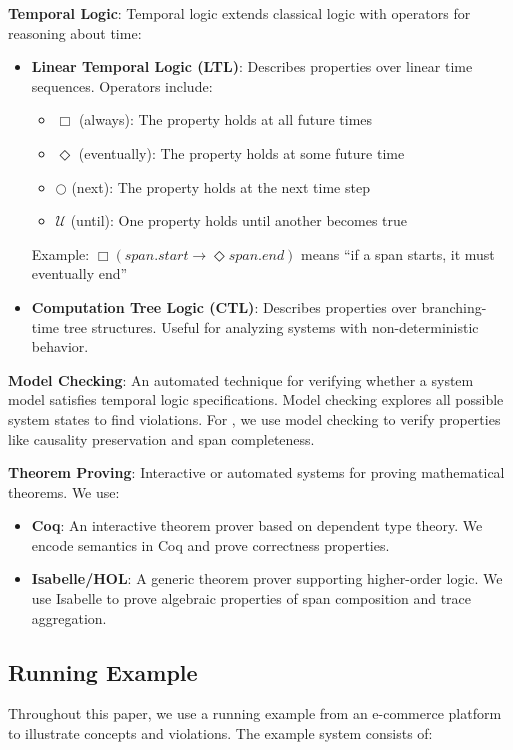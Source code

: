 \textbf{Temporal Logic}: Temporal logic extends classical logic with operators for reasoning about time:
\begin{itemize}
\item \textbf{Linear Temporal Logic (LTL)}: Describes properties over linear time sequences. Operators include:
  \begin{itemize}
  \item $\Box$ (always): The property holds at all future times
  \item $\Diamond$ (eventually): The property holds at some future time
  \item $\bigcirc$ (next): The property holds at the next time step
  \item $\mathcal{U}$ (until): One property holds until another becomes true
  \end{itemize}
  Example: $\Box(\textit{span.start} \rightarrow \Diamond\textit{span.end})$ means ``if a span starts, it must eventually end''

\item \textbf{Computation Tree Logic (CTL)}: Describes properties over branching-time tree structures. Useful for analyzing systems with non-deterministic behavior.
\end{itemize}

\textbf{Model Checking}: An automated technique for verifying whether a system model satisfies temporal logic specifications. Model checking explores all possible system states to find violations. For \otlp, we use model checking to verify properties like causality preservation and span completeness.

\textbf{Theorem Proving}: Interactive or automated systems for proving mathematical theorems. We use:
\begin{itemize}
\item \textbf{Coq}: An interactive theorem prover based on dependent type theory. We encode \otlp semantics in Coq and prove correctness properties.
\item \textbf{Isabelle/HOL}: A generic theorem prover supporting higher-order logic. We use Isabelle to prove algebraic properties of span composition and trace aggregation.
\end{itemize}

\subsection{Running Example}
\label{sec:background-example}

Throughout this paper, we use a running example from an e-commerce platform to illustrate concepts and violations. The example system consists of:

